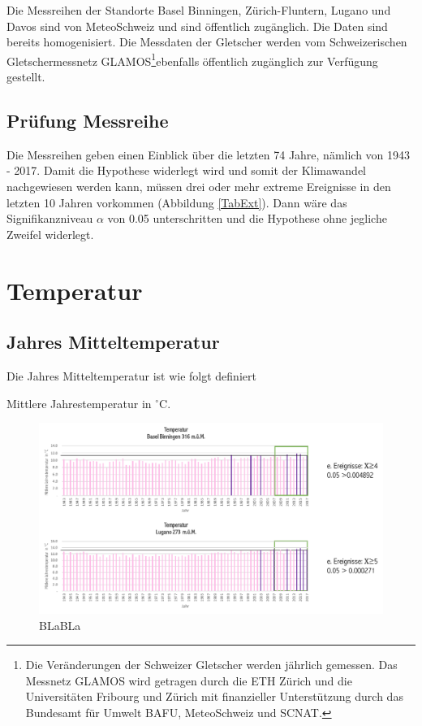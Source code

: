 \begin{refsection}
Die Messreihen der Standorte Basel Binningen, Zürich-Fluntern, Lugano und Davos sind von MeteoSchweiz und sind öffentlich zugänglich. Die Daten sind bereits homogenisiert.
Die Messdaten der Gletscher werden vom Schweizerischen Gletschermessnetz GLAMOS\footnote{%
Die Veränderungen der Schweizer Gletscher werden jährlich gemessen. Das Messnetz GLAMOS wird getragen durch die ETH Zürich und die Universitäten Fribourg und Zürich mit finanzieller Unterstützung durch das Bundesamt für Umwelt BAFU, MeteoSchweiz und SCNAT.}ebenfalls öffentlich zugänglich zur Verfügung gestellt.


\subsection{Prüfung Messreihe}
Die Messreihen geben einen Einblick über die letzten 74 Jahre, nämlich von 1943 - 2017. Damit die Hypothese widerlegt wird und somit der Klimawandel nachgewiesen werden kann, müssen drei oder mehr extreme Ereignisse in den letzten 10 Jahren vorkommen (Abbildung \ref{TabExt}). Dann wäre das Signifikanzniveau $\alpha$ von 0.05 unterschritten und die Hypothese ohne jegliche Zweifel widerlegt.


\section{Temperatur}


\subsection{Jahres Mitteltemperatur}
Die Jahres Mitteltemperatur ist wie folgt definiert

\begin{definition}
Mittlere Jahrestemperatur in $^{\circ}$C.
\end{definition}

\begin{figure}[htbp]
\centering
\includegraphics[width=1.0\textwidth]{extrem/JMittel.pdf}
\caption{BLaBLa}
\label{JMittel}
\end{figure}


\end{refsection}
